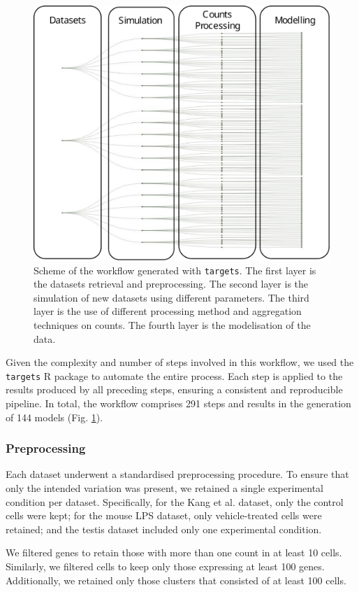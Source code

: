\documentclass[a4paper, 11pt, twocolumn]{article}
\begin{document}
\begin{multicols}{2}
\begin{figure}[H]
	\centering
	\includegraphics[width=0.7\columnwidth]{img/workflowCut.pdf}
	\caption{{\footnotesize Scheme of the workflow generated with \texttt{targets}. The first layer is the datasets retrieval and preprocessing. The second layer is the simulation of new datasets using different parameters. The third layer is the use of different processing method and aggregation techniques on counts. The fourth layer is the modelisation of the data.}}
	\label{fig:workflow}
\end{figure}

Given the complexity and number of steps involved in this workflow, we used the \texttt{targets} R package \citep{targets} to automate the entire process. Each step is applied to the results produced by all preceding steps, ensuring a consistent and reproducible pipeline. In total, the workflow comprises 291 steps and results in the generation of 144 models (Fig. \ref{fig:workflow}).

\subsubsection{Preprocessing}

Each dataset underwent a standardised preprocessing procedure. To ensure that only the intended variation was present, we retained a single experimental condition per dataset. Specifically, for the Kang et al. dataset, only the control cells were kept; for the mouse LPS dataset, only vehicle-treated cells were retained; and the testis dataset included only one experimental condition.

We filtered genes to retain those with more than one count in at least 10 cells. Similarly, we filtered cells to keep only those expressing at least 100 genes. Additionally, we retained only those clusters that consisted of at least 100 cells.


\end{multicols}
\end{document}
